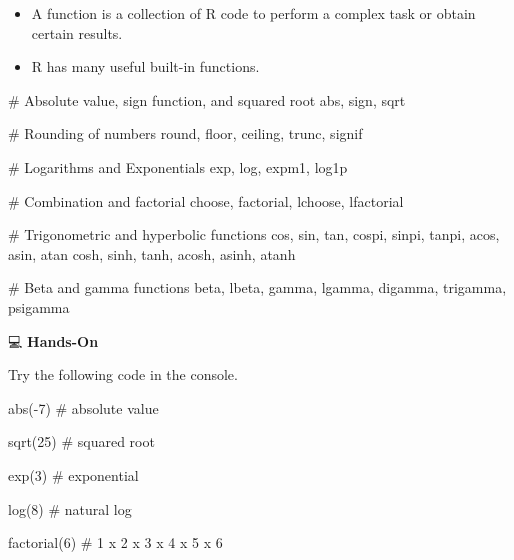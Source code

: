 \documentclass[
  letterpaper,
  DIV=11,
  numbers=noendperiod]{scrreprt}
\newenvironment{Shaded}{\begin{snugshade}}{\end{snugshade}}
\newcommand{\CommentTok}[1]{\textcolor[rgb]{0.37,0.37,0.37}{#1}}
\newcommand{\DecValTok}[1]{\textcolor[rgb]{0.68,0.00,0.00}{#1}}
\newcommand{\FunctionTok}[1]{\textcolor[rgb]{0.28,0.35,0.67}{#1}}
\newcommand{\NormalTok}[1]{\textcolor[rgb]{0.00,0.23,0.31}{#1}}
\newcommand{\SpecialCharTok}[1]{\textcolor[rgb]{0.37,0.37,0.37}{#1}}
\begin{document}
\begin{itemize}
\item
  A function is a collection of R code to perform a complex task or
  obtain certain results.
\item
  R has many useful built-in functions.
\end{itemize}

\begin{Shaded}
\begin{Highlighting}[]
\CommentTok{\# Absolute value, sign function, and squared root}
\NormalTok{abs, sign, sqrt}

\CommentTok{\# Rounding of numbers}
\NormalTok{round, floor, ceiling, trunc, signif}

\CommentTok{\# Logarithms and Exponentials}
\NormalTok{exp, log, expm1, log1p}

\CommentTok{\# Combination and factorial}
\NormalTok{choose, factorial, lchoose, lfactorial}

\CommentTok{\# Trigonometric and hyperbolic functions}
\NormalTok{cos, sin, tan, cospi, sinpi, tanpi, acos, asin, atan}
\NormalTok{cosh, sinh, tanh, acosh, asinh, atanh}

\CommentTok{\# Beta and gamma functions}
\NormalTok{beta, lbeta, gamma, lgamma, digamma, trigamma, psigamma}
\end{Highlighting}
\end{Shaded}

💻 \textbf{Hands-On}

Try the following code in the console.

\begin{Shaded}
\begin{Highlighting}[]
\FunctionTok{abs}\NormalTok{(}\SpecialCharTok{{-}}\DecValTok{7}\NormalTok{)         }\CommentTok{\# absolute value}

\FunctionTok{sqrt}\NormalTok{(}\DecValTok{25}\NormalTok{)        }\CommentTok{\# squared root}

\FunctionTok{exp}\NormalTok{(}\DecValTok{3}\NormalTok{)          }\CommentTok{\# exponential}

\FunctionTok{log}\NormalTok{(}\DecValTok{8}\NormalTok{)          }\CommentTok{\# natural log}

\FunctionTok{factorial}\NormalTok{(}\DecValTok{6}\NormalTok{)    }\CommentTok{\# 1 x 2 x 3 x 4 x 5 x 6}
\end{Highlighting}
\end{Shaded}
\end{document}
